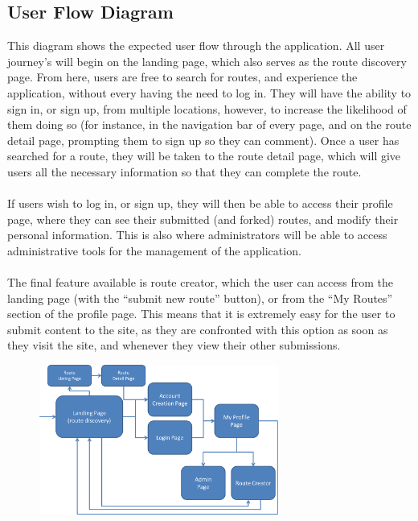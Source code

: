 \documentclass[a4paper,twoside,notitlepage,11pt]{article}
\begin{document}
\subsection{User Flow Diagram}
 This diagram shows the expected user flow through the application. All user journey's will begin on the landing page, which also serves as the route discovery page. From here, users are free to search for routes, and experience the application, without every having the need to log in. They will have the ability to sign in, or sign up, from multiple locations, however, to increase the likelihood of them doing so (for instance, in the navigation bar of every page, and on the route detail page, prompting them to sign up so they can comment). Once a user has searched for a route, they will be taken to the route detail page, which will give users all the necessary information so that they can complete the route.\ \\
 \ \\
 If users wish to log in, or sign up, they will then be able to access their profile page, where they can see their submitted (and forked) routes, and modify their personal information. This is also where administrators will be able to access administrative tools for the management of the application. \ \\
 \ \\
The final feature available is route creator, which the user can access from the landing page (with the ``submit new route'' button), or from the ``My Routes'' section of the profile page. This means that it is extremely easy for the user to submit content to the site, as they are confronted with this option as soon as they visit the site, and whenever they view their other submissions.
 
 \begin{figure}[!ht]
 \begin{center}
 \includegraphics[width=0.7\textwidth]{images/flow.png}
 \end{center}
 \vspace{-6mm}
 \end{figure}
\end{document}
